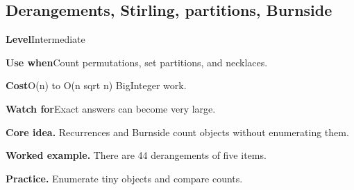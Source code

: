\documentclass[10pt,letterpaper]{article}
\newcommand{\entrylabel}[1]{\textcolor{accent}{\bfseries #1}}
\begin{document}
\subsection{Derangements, Stirling, partitions, Burnside}
\begin{guidebox}\small
\entrylabel{Level}\quad Intermediate\par
\entrylabel{Use when}\quad Count permutations, set partitions, and necklaces.\par
\entrylabel{Cost}\quad O(n) to O(n sqrt n) BigInteger work.\par
\entrylabel{Watch for}\quad Exact answers can become very large.\par
\end{guidebox}
\noindent\textbf{Core idea.} Recurrences and Burnside count objects without enumerating them.\par
\noindent\textbf{Worked example.} There are 44 derangements of five items.\par
\noindent\textbf{Practice.} Enumerate tiny objects and compare counts.\par
\end{document}
